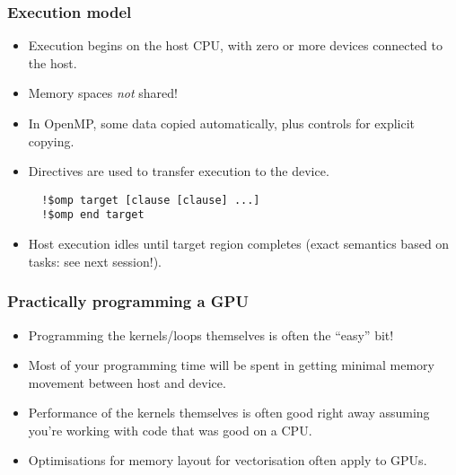 \documentclass{beamer}
\begin{document}
\begin{frame}[fragile]
\frametitle{Execution model}
\begin{itemize}
  \item Execution begins on the host CPU, with zero or more devices connected to the host.
  \item Memory spaces \emph{not} shared!
  \item In OpenMP, some data copied automatically, plus controls for explicit copying.
  \item Directives are used to transfer execution to the device.
  \begin{verbatim}
  !$omp target [clause [clause] ...]
  !$omp end target
  \end{verbatim}
  \item Host execution idles until target region completes (exact semantics based on tasks: see next session!).
\end{itemize}

\vfill

\begin{center}
\end{center}
\end{frame}

\begin{frame}
\frametitle{Practically programming a GPU}
\begin{itemize}
  \item Programming the kernels/loops themselves is often the ``easy'' bit!
  \item Most of your programming time will be spent in getting minimal memory movement between host and device.
  \item Performance of the kernels themselves is often good right away assuming you're working with code that was good on a CPU.
  \item Optimisations for memory layout for vectorisation often apply to GPUs.
\end{itemize}

\end{frame}
\end{document}

